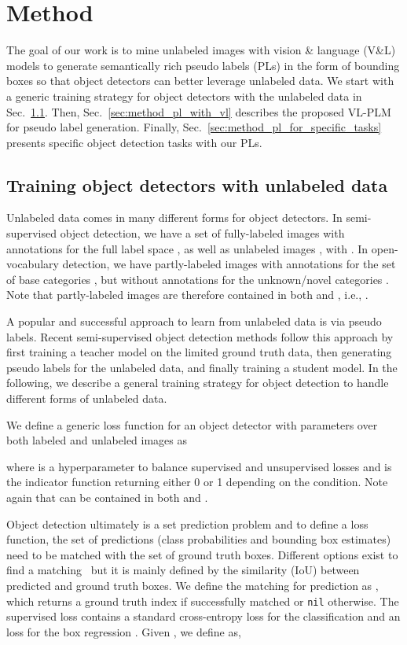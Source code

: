 \documentclass[runningheads]{llncs}
\begin{document}
\section{Method}
\label{sec:method}

The goal of our work is to mine unlabeled images with vision \& language (V\&L) models to generate semantically rich pseudo labels (PLs) in the form of bounding boxes so that object detectors can better leverage unlabeled data.  
We start with a generic training strategy for object detectors with the unlabeled data in Sec.~\ref{sec:method_train_from_unlabeled}. Then, Sec.~\ref{sec:method_pl_with_vl} describes the proposed VL-PLM for pseudo label generation. 
Finally, Sec.~\ref{sec:method_pl_for_specific_tasks} presents specific object detection tasks with our PLs.


\subsection{Training object detectors with unlabeled data}
\label{sec:method_train_from_unlabeled}

Unlabeled data comes in many different forms for object detectors.  In semi-supervised object detection, we have a set of fully-labeled images  with annotations for the full label space , as well as unlabeled images , with  .  In open-vocabulary detection, we have partly-labeled images with annotations for the set of base categories , but without annotations for the unknown/novel categories .  Note that partly-labeled images are therefore contained in both  and , i.e., .


A popular and successful approach to learn from unlabeled data is via pseudo labels.  Recent semi-supervised object detection methods follow this approach by first training a teacher model on the limited ground truth data, then generating pseudo labels for the unlabeled data, and finally training a student model.  In the following, we describe a general training strategy for object detection to handle different forms of unlabeled data.

We define a generic loss function for an object detector with parameters  over both labeled and unlabeled images as

where  is a hyperparameter to balance supervised  and unsupervised  losses and  is the indicator function returning either 0 or 1 depending on the condition.  Note again that  can be contained in both  and .

Object detection ultimately is a set prediction problem and to define a loss function, the set of predictions (class probabilities and bounding box estimates) need to be matched with the set of ground truth boxes.  Different options exist to find a matching~\cite{carion_eccv_20_detr,he_iccv_17_maskrcnn} but it is mainly defined by the similarity (IoU) between predicted and ground truth boxes.  We define the matching for prediction  as , which returns a ground truth index  if successfully matched or \texttt{nil} otherwise.
The supervised loss  contains a standard cross-entropy loss for the classification  and an  loss for the box regression .  Given , we define  as,
\end{document}
